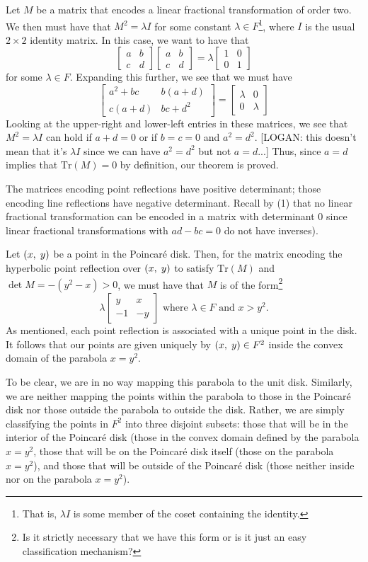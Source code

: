 \documentclass[12pt]{article}
\newcommand{\poincare}{Poincar\'{e} }
\newcommand{\Tr}{\text{Tr}}
\newcommand{\ttc}{, \hspace{1mm}}
\newcommand{\lftmat}[4]{\begin{bmatrix} {#1} & {#2} \\ {#3} & {#4} \end{bmatrix}}
\newcommand{\stanlftmat}{\lftmat{a}{b}{c}{d}}
\newcommand{\pointmat}[2]{\lftmat{{#2}}{{#1}}{-1}{-{#2}}}
\newcommand{\stanpointmat}{\pointmat{x}{y}}
\theoremstyle{plain}
\theoremstyle{definition}
\begin{document}
 Let $M$ be a matrix that encodes a linear fractional transformation of order two. We then must have that $M^2 = \lambda I$ for some constant $\lambda \in F$\footnote{That is, $\lambda I$ is some member of the coset containing the identity.}, where $I$ is the usual $2 \times 2$ identity matrix. In this case, we want to have that 
	\[
		\stanlftmat \stanlftmat = \lambda \lftmat{1}{0}{0}{1}
	\]
for some $\lambda \in F$. Expanding this further, we see that we must have 
	\[
		\lftmat{a^2 + bc}{b(a+d)}{c(a+d)}{bc+d^2} =  \lftmat{\lambda}{0}{0}{\lambda}
	\]
Looking at the upper-right and lower-left entries in these matrices, we see that $M^2 = \lambda I$ can hold if $a + d = 0$ or if $b = c = 0$ and $a^2 = d^2$. [LOGAN: this doesn't mean that it's $\lambda I$ since we can have $a^2 = d^2$ but not $a = d$...] Thus, since $a = d$ implies that $\Tr(M) = 0$ by definition, our theorem is proved. 
\wtfqed





The matrices encoding point reflections have positive determinant; those encoding line reflections have negative determinant. Recall by (1) that no linear fractional transformation can be encoded in a matrix with determinant 0 since linear fractional transformations with $ad - bc = 0$ do not have inverses). 



Let $(x \ttc y)$ be a point in the \poincare disk. Then, for the matrix encoding the hyperbolic point reflection over $(x \ttc y)$ to satisfy $\Tr(M)$ and $\det M = -(y^2 - x) > 0$, we must have that $M$ is of the form\footnote{Is it strictly necessary that we have this form or is it just an easy classification mechanism?} 
\begin{equation} 
	\lambda \stanpointmat \text{ where } \lambda \in F \text{ and } x > y^2. 
\end{equation}	
As mentioned, each point reflection is associated with a unique point in the disk. It follows that our points are given uniquely by $(x \ttc y) \in F^2$ inside the convex domain of the parabola $x = y^2$.

To be clear, we are in no way mapping this parabola to the unit disk. Similarly, we are neither mapping the points within the parabola to those in the \poincare disk nor those outside the parabola to outside the disk. Rather, we are simply classifying the points in $F^2$ into three disjoint subsets: those that will be in the interior of the \poincare disk (those in the convex domain defined by the parabola $x = y^2$, those that will be on the \poincare disk itself (those on the parabola $x = y^2$), and those that will be outside of the \poincare disk (those neither inside nor on the parabola $x = y^2$). 
\end{document}
